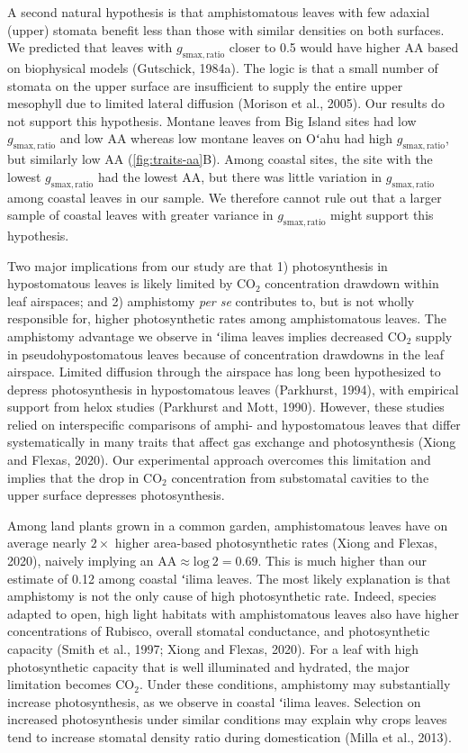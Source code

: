 \documentclass[
  letterpaper,
  DIV=11,
  numbers=noendperiod]{scrartcl}
\begin{document}
A second natural hypothesis is that amphistomatous leaves with few
adaxial (upper) stomata benefit less than those with similar densities
on both surfaces. We predicted that leaves with
\(g_\mathrm{smax,ratio}\) closer to 0.5 would have higher
\(\mathrm{AA}\) based on biophysical models (Gutschick, 1984a). The
logic is that a small number of stomata on the upper surface are
insufficient to supply the entire upper mesophyll due to limited lateral
diffusion (Morison et al., 2005). Our results do not support this
hypothesis. Montane leaves from Big Island sites had low
\(g_\mathrm{smax,ratio}\) and low \(\mathrm{AA}\) whereas low montane
leaves on Oʻahu had high \(g_\mathrm{smax,ratio}\), but similarly low
\(\mathrm{AA}\) (\autoref{fig:traits-aa}B). Among coastal sites, the
site with the lowest \(g_\mathrm{smax,ratio}\) had the lowest
\(\mathrm{AA}\), but there was little variation in
\(g_\mathrm{smax,ratio}\) among coastal leaves in our sample. We
therefore cannot rule out that a larger sample of coastal leaves with
greater variance in \(g_\mathrm{smax,ratio}\) might support this
hypothesis.

Two major implications from our study are that 1) photosynthesis in
hypostomatous leaves is likely limited by CO\(_2\) concentration
drawdown within leaf airspaces; and 2) amphistomy \emph{per se}
contributes to, but is not wholly responsible for, higher photosynthetic
rates among amphistomatous leaves. The amphistomy advantage we observe
in ʻilima leaves implies decreased CO\(_2\) supply in
pseudohypostomatous leaves because of concentration drawdowns in the
leaf airspace. Limited diffusion through the airspace has long been
hypothesized to depress photosynthesis in hypostomatous leaves
(Parkhurst, 1994), with empirical support from helox studies (Parkhurst
and Mott, 1990). However, these studies relied on interspecific
comparisons of amphi- and hypostomatous leaves that differ
systematically in many traits that affect gas exchange and
photosynthesis (Xiong and Flexas, 2020). Our experimental approach
overcomes this limitation and implies that the drop in CO\(_2\)
concentration from substomatal cavities to the upper surface depresses
photosynthesis.

Among land plants grown in a common garden, amphistomatous leaves have
on average nearly \(2\times\) higher area-based photosynthetic rates
(Xiong and Flexas, 2020), naively implying an
\(\mathrm{AA} \approx \text{log}~2 = 0.69\). This is much higher than
our estimate of 0.12 among coastal ʻilima leaves. The most likely
explanation is that amphistomy is not the only cause of high
photosynthetic rate. Indeed, species adapted to open, high light
habitats with amphistomatous leaves also have higher concentrations of
Rubisco, overall stomatal conductance, and photosynthetic capacity
(Smith et al., 1997; Xiong and Flexas, 2020). For a leaf with high
photosynthetic capacity that is well illuminated and hydrated, the major
limitation becomes CO\(_2\). Under these conditions, amphistomy may
substantially increase photosynthesis, as we observe in coastal ʻilima
leaves. Selection on increased photosynthesis under similar conditions
may explain why crops leaves tend to increase stomatal density ratio
during domestication (Milla et al., 2013).
\end{document}
